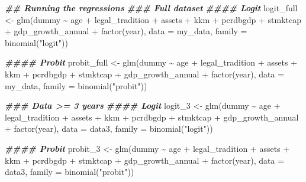 \documentclass[a4paper,nobind]{templates/ociamthesis}
\newenvironment{Shaded}{\begin{snugshade}}{\end{snugshade}}
\newcommand{\AttributeTok}[1]{\textcolor[rgb]{0.77,0.63,0.00}{#1}}
\newcommand{\DocumentationTok}[1]{\textcolor[rgb]{0.56,0.35,0.01}{\textbf{\textit{#1}}}}
\newcommand{\FunctionTok}[1]{\textcolor[rgb]{0.00,0.00,0.00}{#1}}
\newcommand{\NormalTok}[1]{#1}
\newcommand{\OtherTok}[1]{\textcolor[rgb]{0.56,0.35,0.01}{#1}}
\newcommand{\SpecialCharTok}[1]{\textcolor[rgb]{0.00,0.00,0.00}{#1}}
\newcommand{\StringTok}[1]{\textcolor[rgb]{0.31,0.60,0.02}{#1}}
\renewenvironment{Shaded}
{
  \vspace{10pt}%
  \begin{snugshade}%
}{%
  \end{snugshade}%
  \vspace{8pt}%
}
\begin{document}
\begin{Shaded}
\begin{Highlighting}[]
\DocumentationTok{\#\# Running the regressions }
\DocumentationTok{\#\#\# Full dataset}
\DocumentationTok{\#\#\#\# Logit}
\NormalTok{logit\_full }\OtherTok{\textless{}{-}} \FunctionTok{glm}\NormalTok{(dummy }\SpecialCharTok{\textasciitilde{}}\NormalTok{ age }\SpecialCharTok{+}\NormalTok{ legal\_tradition }\SpecialCharTok{+} 
\NormalTok{       assets }\SpecialCharTok{+}\NormalTok{ kkm }\SpecialCharTok{+} 
\NormalTok{       pcrdbgdp }\SpecialCharTok{+}\NormalTok{ stmktcap }\SpecialCharTok{+}\NormalTok{ gdp\_growth\_annual }\SpecialCharTok{+} 
       \FunctionTok{factor}\NormalTok{(year), }\AttributeTok{data =}\NormalTok{ my\_data, }
       \AttributeTok{family =} \FunctionTok{binomial}\NormalTok{(}\StringTok{"logit"}\NormalTok{))}

\DocumentationTok{\#\#\#\# Probit}
\NormalTok{probit\_full }\OtherTok{\textless{}{-}} \FunctionTok{glm}\NormalTok{(dummy }\SpecialCharTok{\textasciitilde{}}\NormalTok{ age }\SpecialCharTok{+}\NormalTok{ legal\_tradition }\SpecialCharTok{+} 
\NormalTok{       assets }\SpecialCharTok{+}\NormalTok{ kkm }\SpecialCharTok{+} 
\NormalTok{       pcrdbgdp }\SpecialCharTok{+}\NormalTok{ stmktcap }\SpecialCharTok{+}\NormalTok{ gdp\_growth\_annual }\SpecialCharTok{+} 
       \FunctionTok{factor}\NormalTok{(year), }\AttributeTok{data =}\NormalTok{ my\_data,}
       \AttributeTok{family =} \FunctionTok{binomial}\NormalTok{(}\StringTok{"probit"}\NormalTok{))}

\DocumentationTok{\#\#\# Data \textgreater{}= 3 years}
\DocumentationTok{\#\#\#\# Logit}
\NormalTok{logit\_3 }\OtherTok{\textless{}{-}} \FunctionTok{glm}\NormalTok{(dummy }\SpecialCharTok{\textasciitilde{}}\NormalTok{ age }\SpecialCharTok{+}\NormalTok{ legal\_tradition }\SpecialCharTok{+} 
\NormalTok{       assets }\SpecialCharTok{+}\NormalTok{ kkm }\SpecialCharTok{+} 
\NormalTok{       pcrdbgdp }\SpecialCharTok{+}\NormalTok{ stmktcap }\SpecialCharTok{+}\NormalTok{ gdp\_growth\_annual }\SpecialCharTok{+} 
       \FunctionTok{factor}\NormalTok{(year), }\AttributeTok{data =}\NormalTok{ data3,}
       \AttributeTok{family =} \FunctionTok{binomial}\NormalTok{(}\StringTok{"logit"}\NormalTok{))}

\DocumentationTok{\#\#\#\# Probit}
\NormalTok{probit\_3 }\OtherTok{\textless{}{-}} \FunctionTok{glm}\NormalTok{(dummy }\SpecialCharTok{\textasciitilde{}}\NormalTok{ age }\SpecialCharTok{+}\NormalTok{ legal\_tradition }\SpecialCharTok{+} 
\NormalTok{       assets }\SpecialCharTok{+}\NormalTok{ kkm }\SpecialCharTok{+} 
\NormalTok{       pcrdbgdp }\SpecialCharTok{+}\NormalTok{ stmktcap }\SpecialCharTok{+}\NormalTok{ gdp\_growth\_annual }\SpecialCharTok{+} 
       \FunctionTok{factor}\NormalTok{(year), }\AttributeTok{data =}\NormalTok{ data3,}
       \AttributeTok{family =} \FunctionTok{binomial}\NormalTok{(}\StringTok{"probit"}\NormalTok{))}


\end{Highlighting}
\end{Shaded}
\end{document}
